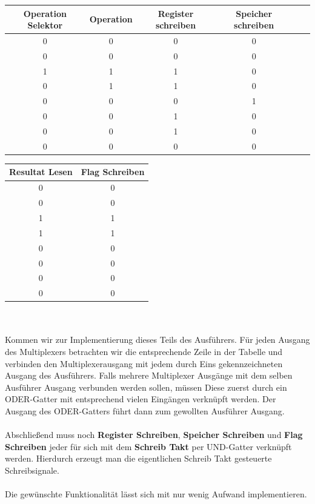 \documentclass[11pt,a4paper,leqno]{report}
\numberwithin{equation}{chapter}
\begin{document}
\begin{center}
	\begin{tabular}{|c|c|c|c|c|c|}
		Operation Selektor & Operation & Register schreiben & Speicher schreiben \\
		\hline
		0 & 0 & 0 & 0\\
		0 & 0 & 0 & 0\\
		1 & 1 & 1 & 0\\
		0 & 1 & 1 & 0\\
		0 & 0 & 0 & 1\\
		0 & 0 & 1 & 0\\
		0 & 0 & 1 & 0\\
		0 & 0 & 0 & 0\\
	\end{tabular}  
\end{center}
\begin{tabular}{|c|c|}
		Resultat Lesen & Flag Schreiben \\
		\hline
		0 & 0\\
		0 & 0\\
		1 & 1\\
		1 & 1\\
		0 & 0\\
		0 & 0\\
		0 & 0\\
		0 & 0\\
\end{tabular}\\  
\\
Kommen wir zur Implementierung dieses Teils des Ausf\"uhrers. Für jeden Ausgang des Multiplexers betrachten wir die entsprechende Zeile in der Tabelle und verbinden den Multiplexerausgang mit jedem durch Eins gekennzeichneten Ausgang des Ausf\"uhrers.
Falls mehrere Multiplexer Ausg\"ange mit dem selben Ausf\"uhrer Ausgang verbunden werden sollen, m\"ussen Diese zuerst durch ein ODER-Gatter mit entsprechend vielen Eing\"angen verkn\"upft werden. Der Ausgang des ODER-Gatters f\"uhrt dann zum gewollten Ausf\"uhrer Ausgang.\\
\\
Abschlie\ss{}end muss noch \textbf{Register Schreiben}, \textbf{Speicher Schreiben} und \textbf{Flag Schreiben} jeder f\"ur sich mit dem \textbf{Schreib Takt} per UND-Gatter verkn\"upft werden. Hierdurch erzeugt man die eigentlichen Schreib Takt gesteuerte Schreibsignale.\\
\\
Die gew\"unschte Funktionalit\"at l\"asst sich mit nur wenig Aufwand implementieren.
\end{document}
